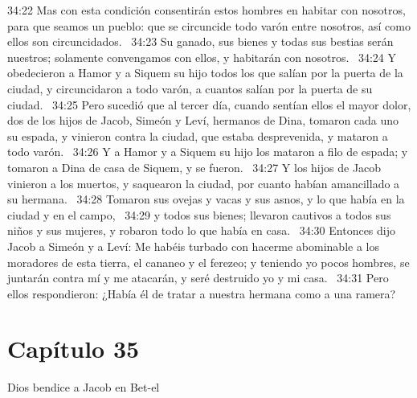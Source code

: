 34:22 Mas con esta condición consentirán estos hombres en habitar con nosotros, para que seamos un pueblo: que se circuncide todo varón entre nosotros, así como ellos son circuncidados.  
34:23 Su ganado, sus bienes y todas sus bestias serán nuestros; solamente convengamos con ellos, y habitarán con nosotros.  
34:24 Y obedecieron a Hamor y a Siquem su hijo todos los que salían por la puerta de la ciudad, y circuncidaron a todo varón, a cuantos salían por la puerta de su ciudad.  
34:25 Pero sucedió que al tercer día, cuando sentían ellos el mayor dolor, dos de los hijos de Jacob, Simeón y Leví, hermanos de Dina, tomaron cada uno su espada, y vinieron contra la ciudad, que estaba desprevenida, y mataron a todo varón.  
34:26 Y a Hamor y a Siquem su hijo los mataron a filo de espada; y tomaron a Dina de casa de Siquem, y se fueron.  
34:27 Y los hijos de Jacob vinieron a los muertos, y saquearon la ciudad, por cuanto habían amancillado a su hermana.  
34:28 Tomaron sus ovejas y vacas y sus asnos, y lo que había en la ciudad y en el campo,  
34:29 y todos sus bienes; llevaron cautivos a todos sus niños y sus mujeres, y robaron todo lo que había en casa.  
34:30 Entonces dijo Jacob a Simeón y a Leví: Me habéis turbado con hacerme abominable a los moradores de esta tierra, el cananeo y el ferezeo; y teniendo yo pocos hombres, se juntarán contra mí y me atacarán, y seré destruido yo y mi casa.  
34:31 Pero ellos respondieron: ¿Había él de tratar a nuestra hermana como a una ramera?  

\section*{Capítulo 35}
Dios bendice a Jacob en Bet-el  

